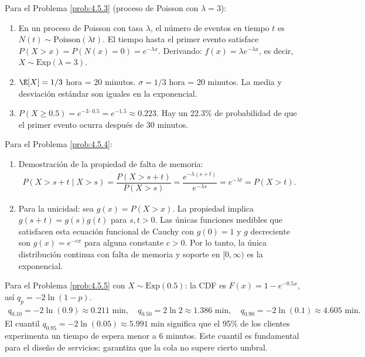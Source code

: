 \begin{solucion}
	\label{sol:4.5.3}
	Para el Problema \ref{prob:4.5.3} (proceso de Poisson con $\lambda = 3$):
	\begin{enumerate}
		\item En un proceso de Poisson con tasa $\lambda$, el número de eventos en tiempo $t$ es $N(t) \sim \text{Poisson}(\lambda t)$. El tiempo hasta el primer evento satisface $P(X > x) = P(N(x) = 0) = e^{-\lambda x}$. Derivando: $f(x) = \lambda e^{-\lambda x}$, es decir, $X \sim \text{Exp}(\lambda = 3)$.
		\item $\E[X] = 1/3$ hora = 20 minutos. $\sigma = 1/3$ hora = 20 minutos. La media y desviación estándar son iguales en la exponencial.
		\item $P(X \ge 0.5) = e^{-3 \cdot 0.5} = e^{-1.5} \approx 0.223$. Hay un 22.3\% de probabilidad de que el primer evento ocurra después de 30 minutos.
	\end{enumerate}
\end{solucion}

\begin{solucion}
	\label{sol:4.5.4}
	Para el Problema \ref{prob:4.5.4}:
	\begin{enumerate}
		\item Demostración de la propiedad de falta de memoria:
		\begin{align*}
			P(X > s + t \mid X > s) = \dfrac{P(X > s + t)}{P(X > s)} = \dfrac{e^{-\lambda(s+t)}}{e^{-\lambda s}} = e^{-\lambda t} = P(X > t).
		\end{align*}
		\item Para la unicidad: sea $g(x) = P(X > x)$. La propiedad implica $g(s + t) = g(s) g(t)$ para $s, t > 0$. Las únicas funciones medibles que satisfacen esta ecuación funcional de Cauchy con $g(0) = 1$ y $g$ decreciente son $g(x) = e^{-cx}$ para alguna constante $c > 0$. Por lo tanto, la única distribución continua con falta de memoria y soporte en $[0, \infty)$ es la exponencial. \quad \qedhere
	\end{enumerate}
\end{solucion}

\begin{solucion}
	\label{sol:4.5.5}
	Para el Problema \ref{prob:4.5.5} con $X \sim \text{Exp}(0.5)$: la CDF es $F(x) = 1 - e^{-0.5 x}$, así $q_{p} = -2\ln(1-p)$.
	\begin{align*}
		q_{0.10} = -2\ln(0.9) \approx 0.211 \text{ min}, \quad q_{0.50} = 2\ln 2 \approx 1.386 \text{ min}, \quad q_{0.90} = -2\ln(0.1) \approx 4.605 \text{ min}.
	\end{align*}
	El cuantil $q_{0.95} = -2\ln(0.05) \approx 5.991$ min significa que el 95\% de los clientes experimenta un tiempo de espera menor a 6 minutos. Este cuantil es fundamental para el diseño de servicios: garantiza que la cola no supere cierto umbral.
\end{solucion}

